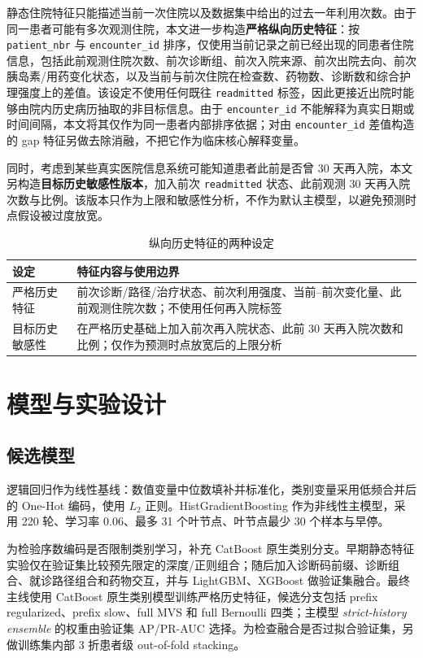 \documentclass[UTF8,a4paper,11pt,fontset=none]{ctexart}
\begin{document}
静态住院特征只能描述当前一次住院以及数据集中给出的过去一年利用次数。由于同一患者可能有多次观测住院，本文进一步构造\textbf{严格纵向历史特征}：按 \texttt{patient\_nbr} 与 \texttt{encounter\_id} 排序，仅使用当前记录之前已经出现的同患者住院信息，包括此前观测住院次数、前次诊断组、前次入院来源、前次出院去向、前次胰岛素/用药变化状态，以及当前与前次住院在检查数、药物数、诊断数和综合护理强度上的差值。该设定不使用任何既往 \texttt{readmitted} 标签，因此更接近出院时能够由院内历史病历抽取的非目标信息。由于 \texttt{encounter\_id} 不能解释为真实日期或时间间隔，本文将其仅作为同一患者内部排序依据；对由 \texttt{encounter\_id} 差值构造的 gap 特征另做去除消融，不把它作为临床核心解释变量。

同时，考虑到某些真实医院信息系统可能知道患者此前是否曾 30 天再入院，本文另构造\textbf{目标历史敏感性版本}，加入前次 \texttt{readmitted} 状态、此前观测 30 天再入院次数与比例。该版本只作为上限和敏感性分析，不作为默认主模型，以避免预测时点假设被过度放宽。

\begin{table}[H]
\centering
\caption{纵向历史特征的两种设定}
\begin{tabularx}{0.92\textwidth}{lX}
\toprule
设定 & 特征内容与使用边界 \\
\midrule
严格历史特征 & 前次诊断/路径/治疗状态、前次利用强度、当前--前次变化量、此前观测住院次数；不使用任何再入院标签 \\
目标历史敏感性 & 在严格历史基础上加入前次再入院状态、此前 30 天再入院次数和比例；仅作为预测时点放宽后的上限分析 \\
\bottomrule
\end{tabularx}
\end{table}

\section{模型与实验设计}

\subsection{候选模型}

逻辑回归作为线性基线：数值变量中位数填补并标准化，类别变量采用低频合并后的 One-Hot 编码，使用 $L_2$ 正则。HistGradientBoosting 作为非线性主模型，采用 220 轮、学习率 0.06、最多 31 个叶节点、叶节点最少 30 个样本与早停\cite{friedman2001}。

为检验序数编码是否限制类别学习，补充 CatBoost 原生类别分支\cite{prokhorenkova2018}。早期静态特征实验仅在验证集比较预先限定的深度/正则组合；随后加入诊断码前缀、诊断组合、就诊路径组合和药物交互，并与 LightGBM、XGBoost 做验证集融合\cite{ke2017,chen2016}。最终主线使用 CatBoost 原生类别模型训练严格历史特征，候选分支包括 prefix regularized、prefix slow、full MVS 和 full Bernoulli 四类；主模型 \textit{strict-history ensemble} 的权重由验证集 AP/PR-AUC 选择。为检查融合是否过拟合验证集，另做训练集内部 3 折患者级 out-of-fold stacking\cite{wolpert1992}。
\end{document}
